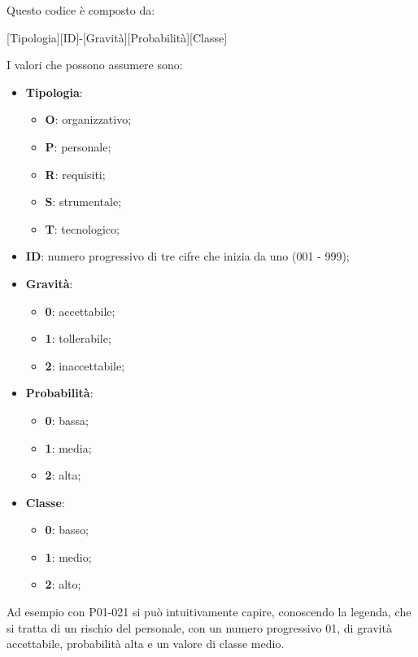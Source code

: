 	Questo codice è composto da:
	
	\begin{center}
		[Tipologia][ID]-[Gravità][Probabilità][Classe]
	\end{center}

	I valori che possono assumere sono:
	
	\begin{itemize}
		\item \textbf{Tipologia}:
			\begin{itemize}
				\item \textbf{O}: organizzativo;
				\item \textbf{P}: personale;
				\item \textbf{R}: requisiti;
				\item \textbf{S}: strumentale;
				\item \textbf{T}: tecnologico;
			\end{itemize}
		
		\item \textbf{ID}: numero progressivo di tre cifre che inizia da uno (001 - 999);
		\item \textbf{Gravità}:
			\begin{itemize}
				\item \textbf{0}: accettabile;
				\item \textbf{1}: tollerabile;
				\item \textbf{2}: inaccettabile;
			\end{itemize}
		
		\item \textbf{Probabilità}:
			\begin{itemize}
				\item \textbf{0}: bassa;
				\item \textbf{1}: media;
				\item \textbf{2}: alta;
			\end{itemize}
		
		\item \textbf{Classe}:
			\begin{itemize}
				\item \textbf{0}: basso;
				\item \textbf{1}: medio;
				\item \textbf{2}: alto;
			\end{itemize}
	\end{itemize}

	Ad esempio con P01-021 si può intuitivamente capire, conoscendo la legenda, che si tratta di un rischio del personale, con un numero progressivo 01, di gravità accettabile, probabilità alta e un valore di classe medio.
	
